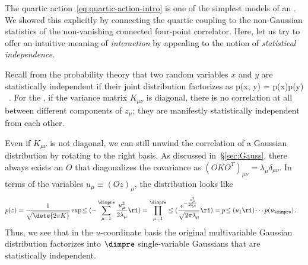 The quartic action~\eqref{eq:quartic-action-intro} is one of the simplest models of an . We showed this explicitly by connecting the quartic coupling to the non-Gaussian statistics of the non-vanishing connected four-point correlator. Here, let us try to offer an intuitive meaning of \emph{interaction} by appealing to the notion of \emph{statistical independence}. 


Recall from the probability theory that two random variables $x$ and $y$ are statistically independent if their joint distribution factorizes as
\be\label{eq:independence-random-variables}
p(x, y) = p(x)p(y) \, .
\ee
For the , if the variance matrix $K_{\mu\nu}$ is diagonal, there is no correlation at all between different components of $z_{\mu}$; they are manifestly statistically independent from each other. 

Even if $K_{\mu\nu}$ is not diagonal, we can still unwind the correlation of a Gaussian distribution by rotating to the right basis. As discussed in~\S\ref{sec:Gauss}, there always exists an  $O$ that diagonalizes the covariance as $(OK O^T)_{\mu\nu}=\lambda_{\mu} \delta_{\mu\nu}$. In terms of the variables $u_{\mu}\equiv (O z)_{\mu}$, the distribution looks like
\begin{align}\label{eq:gaussian-statistical-independence-day}
p(z) &= \frac{1}{\sqrt{\dete{2\pi K}}} \exp\!\le(-\sum_{\mu=1}^\dimpre\frac{u_\mu^2}{2\lambda_\mu}\ri)=\prod_{\mu=1}^\dimpre  \le( \frac{e^{-\frac{u_\mu^2}{2\lambda_\mu}}}{\sqrt{2\pi \lambda_\mu}}  \ri) =p\!\le(u_1\ri)\cdots p(u_\dimpre) \, .
\end{align}
Thus, we see that in the $u$-coordinate basis the original multivariable Gaussian distribution factorizes into $\dimpre$ single-variable Gaussians that are statistically independent.

